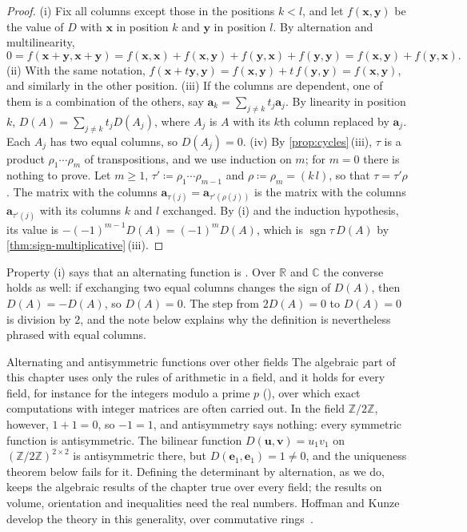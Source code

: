 \begin{proof}
(i) Fix all columns except those in the positions $k<l$, and let $f(\mathbf x,\mathbf y)$ be the value of $D$ with $\mathbf x$ in position $k$ and $\mathbf y$ in position $l$. By alternation and multilinearity,
\[
0=f(\mathbf x+\mathbf y,\mathbf x+\mathbf y)=f(\mathbf x,\mathbf x)+f(\mathbf x,\mathbf y)+f(\mathbf y,\mathbf x)+f(\mathbf y,\mathbf y)=f(\mathbf x,\mathbf y)+f(\mathbf y,\mathbf x).
\]
(ii) With the same notation, $f(\mathbf x+t\mathbf y,\mathbf y)=f(\mathbf x,\mathbf y)+t\,f(\mathbf y,\mathbf y)=f(\mathbf x,\mathbf y)$, and similarly in the other position. (iii) If the columns are dependent, one of them is a combination of the others, say $\mathbf a_k=\sum_{j\ne k}t_j\mathbf a_j$. By linearity in position $k$, $D(A)=\sum_{j\ne k}t_jD(A_j)$, where $A_j$ is $A$ with its $k$th column replaced by $\mathbf a_j$. Each $A_j$ has two equal columns, so $D(A_j)=0$. (iv) By \cref{prop:cycles}\,(iii), $\tau$ is a product $\rho_1\cdots\rho_m$ of transpositions, and we use induction on $m$; for $m=0$ there is nothing to prove. Let $m\ge1$, $\tau'\coloneqq\rho_1\cdots\rho_{m-1}$ and $\rho\coloneqq\rho_m=(k\,l)$, so that $\tau=\tau'\rho$. The matrix with the columns $\mathbf a_{\tau(j)}=\mathbf a_{\tau'(\rho(j))}$ is the matrix with the columns $\mathbf a_{\tau'(j)}$ with its columns $k$ and $l$ exchanged. By (i) and the induction hypothesis, its value is $-(-1)^{m-1}D(A)=(-1)^mD(A)$, which is $\operatorname{sgn}\tau\,D(A)$ by \cref{thm:sign-multiplicative}\,(iii).
\end{proof}

Property (i) says that an alternating function is . Over $\mathbb R$ and $\mathbb C$ the converse holds as well: if exchanging two equal columns changes the sign of $D(A)$, then $D(A)=-D(A)$, so $D(A)=0$. The step from $2D(A)=0$ to $D(A)=0$ is division by $2$, and the note below explains why the definition is nevertheless phrased with equal columns.

\begin{note}{Alternating and antisymmetric functions over other fields}
The algebraic part of this chapter uses only the rules of arithmetic in a field, and it holds for every field, for instance for the integers modulo a prime $p$ (), over which exact computations with integer matrices are often carried out. In the field $\mathbb Z/2\mathbb Z$, however, $1+1=0$, so $-1=1$, and antisymmetry says nothing: every symmetric function is antisymmetric. The bilinear function $D(\mathbf u,\mathbf v)=u_1v_1$ on $(\mathbb Z/2\mathbb Z)^{2\times2}$ is antisymmetric there, but $D(\mathbf e_1,\mathbf e_1)=1\ne0$, and the uniqueness theorem below fails for it. Defining the determinant by alternation, as we do, keeps the algebraic results of the chapter true over every field; the results on volume, orientation and inequalities need the real numbers. Hoffman and Kunze develop the theory in this generality, over commutative rings~\cite[Chap.~5]{hoffman1971}.
\end{note}

